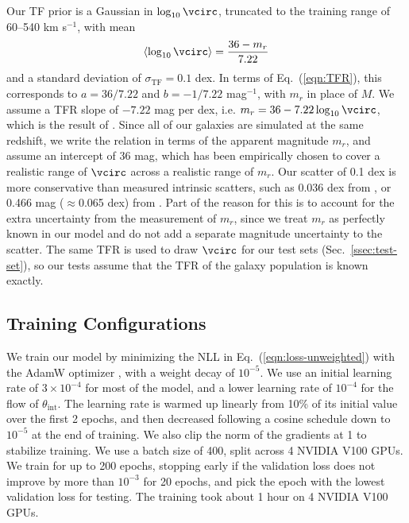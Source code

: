 Our TF prior is a Gaussian in $\log_{10}\vcirc$, truncated to the training range of 60--540 km s$^{-1}$, with mean
\begin{equation}
\label{eqn:tf-mean}
    \langle\log_{10}\vcirc\rangle = \frac{36 - m_r}{7.22}
\end{equation}
and a standard deviation of $\sigma_\mathrm{TF}=0.1$ dex. In terms of Eq.~(\ref{eqn:TFR}), this corresponds to $a = 36/7.22$ and $b = -1/7.22$ mag$^{-1}$, with $m_r$ in place of $M$. We assume a TFR slope of $-7.22$ mag per dex, i.e. $m_r = 36 - 7.22\log_{10}\vcirc$, which is the result of \citep{DESIPVTF2025}. Since all of our galaxies are simulated at the same redshift, we write the relation in terms of the apparent magnitude $m_r$, and assume an intercept of 36 mag, which has been empirically chosen to cover a realistic range of $\vcirc$ across a realistic range of $m_r$. Our scatter of 0.1 dex is more conservative than measured intrinsic scatters, such as 0.036 dex from \citep{Reyes11}, or 0.466 mag ($\approx$0.065 dex) from \citep{DESIPVTF2025}. Part of the reason for this is to account for the extra uncertainty from the measurement of $m_r$, since we treat $m_r$ as perfectly known in our model and do not add a separate magnitude uncertainty to the scatter.  The same TFR is used to draw $\vcirc$ for our test sets (Sec.~\ref{ssec:test-set}), so our tests assume that the TFR of the galaxy population is known exactly.

\subsection{Training Configurations}
\label{ssec:train-conf}

We train our model by minimizing the NLL in Eq.~(\ref{eqn:loss-unweighted}) with the AdamW optimizer \citep{AdamW}, with a weight decay of $10^{-5}$. We use an initial learning rate of $3\times10^{-4}$ for most of the model, and a lower learning rate of $10^{-4}$ for the flow of $\theta_\mathrm{int}$. The learning rate is warmed up linearly from 10\% of its initial value over the first 2 epochs, and then decreased following a cosine schedule down to $10^{-5}$ at the end of training. We also clip the norm of the gradients at 1 to stabilize training. We use a batch size of 400, split across 4 NVIDIA V100 GPUs. We train for up to 200 epochs, stopping early if the validation loss does not improve by more than $10^{-3}$ for 20 epochs, and pick the epoch with the lowest validation loss for testing. The training took about 1 hour on 4 NVIDIA V100 GPUs. 
